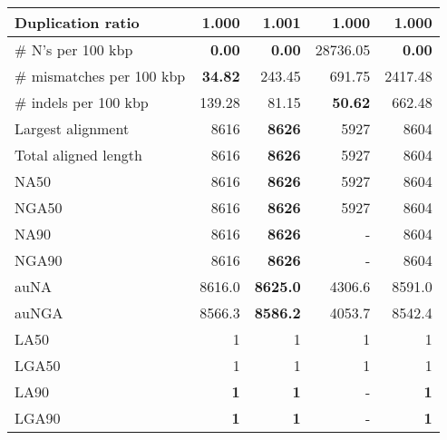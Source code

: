 \documentclass[12pt,a4paper]{article}
\begin{document}
\begin{table}[ht]
\begin{center}
\begin{tabular}{|l*{4}{|r}|}
Duplication ratio & {\bf 1.000} & 1.001 & {\bf 1.000} & {\bf 1.000} \\ \hline
\# N's per 100 kbp & {\bf 0.00} & {\bf 0.00} & 28736.05 & {\bf 0.00} \\ \hline
\# mismatches per 100 kbp & {\bf 34.82} & 243.45 & 691.75 & 2417.48 \\ \hline
\# indels per 100 kbp & 139.28 & 81.15 & {\bf 50.62} & 662.48 \\ \hline
Largest alignment & 8616 & {\bf 8626} & 5927 & 8604 \\ \hline
Total aligned length & 8616 & {\bf 8626} & 5927 & 8604 \\ \hline
NA50 & 8616 & {\bf 8626} & 5927 & 8604 \\ \hline
NGA50 & 8616 & {\bf 8626} & 5927 & 8604 \\ \hline
NA90 & 8616 & {\bf 8626} & - & 8604 \\ \hline
NGA90 & 8616 & {\bf 8626} & - & 8604 \\ \hline
auNA & 8616.0 & {\bf 8625.0} & 4306.6 & 8591.0 \\ \hline
auNGA & 8566.3 & {\bf 8586.2} & 4053.7 & 8542.4 \\ \hline
LA50 & 1 & 1 & 1 & 1 \\ \hline
LGA50 & 1 & 1 & 1 & 1 \\ \hline
LA90 & {\bf 1} & {\bf 1} & - & {\bf 1} \\ \hline
LGA90 & {\bf 1} & {\bf 1} & - & {\bf 1} \\ \hline
\end{tabular}
\end{center}
\end{table}
\end{document}
